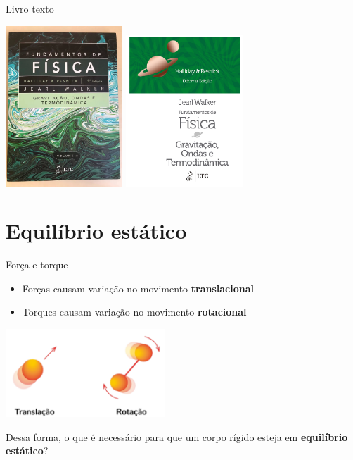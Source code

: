 \begin{frame}[c]{Livro texto}
    \begin{center}
        \includegraphics[width=0.33\textwidth]{images/halliday_9.png}
        \includegraphics[width=0.33\textwidth]{images/halliday_10.png}
    \end{center}
\end{frame}

\section{Equilíbrio estático}

\begin{frame}{Força e torque}
    \begin{itemize}
        \item Forças causam variação no movimento \textbf{translacional}
        \item Torques causam variação no movimento \textbf{rotacional}
    \end{itemize}
    \begin{center}
        \includegraphics[width=6cm]{images/translação-rotação.png}
    \end{center}
    \pause
    Dessa forma, o que é necessário para que um corpo rígido esteja em \textbf{equilíbrio estático}?
\end{frame}

